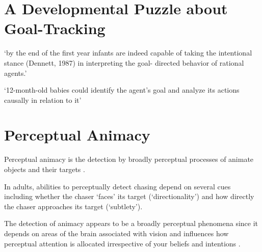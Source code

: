 \documentclass[12pt]{extarticle}
\begin{document}
\begin{multicols*}{3}
 
 
\section{A Developmental Puzzle about Goal-Tracking}
 
‘by the end of the first year infants are indeed capable of taking the intentional stance (Dennett, 1987) in interpreting the goal- directed behavior of rational agents.’
\citep[p.\ 184]{Gergely:1995sq}
 
‘12-month-old babies could identify the agent’s goal and analyze its actions causally in relation to it’
\citep[p.\ 190]{Gergely:1995sq}
 
 
 
\section{Perceptual Animacy}
 
Perceptual animacy is
the detection by broadly perceptual processes of animate objects and their targets
\citet[e.g.][]{gao:2009_psychophysics}.

In adults, abilities to perceptually detect chasing
depend on several cues including whether the chaser ‘faces’ its target (‘directionality’) and how
directly the chaser approaches its target (‘subtlety’).

The detection of animacy appears to be a broadly perceptual phenomena since it depends on areas of
the brain associated with vision and influences how perceptual attention is allocated
\citep{scholl:2013_perceiving} irrespective of your beliefs and intentions
\citep{buren:2016_automaticity}.

\vfill



\footnotesize


\end{multicols*}
\end{document}
